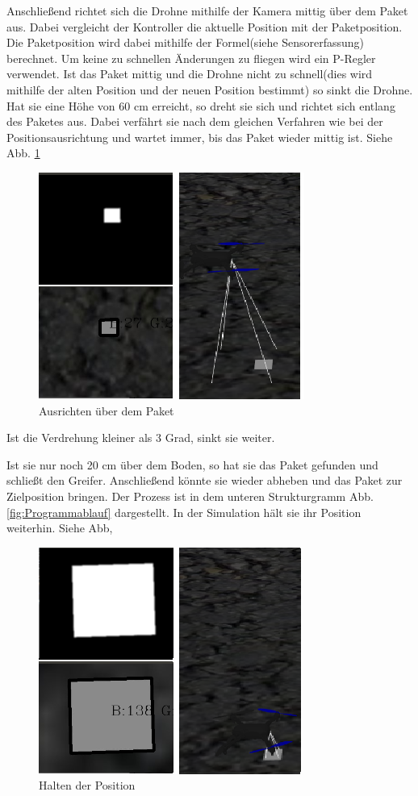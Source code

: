  Anschließend richtet sich die Drohne mithilfe der Kamera mittig über dem Paket aus. Dabei vergleicht der Kontroller die aktuelle Position mit der Paketposition. Die Paketposition wird dabei mithilfe der Formel(siehe Sensorerfassung) berechnet. Um keine zu schnellen Änderungen zu fliegen wird ein P-Regler verwendet. Ist das Paket mittig und die Drohne nicht zu schnell(dies wird mithilfe der alten Position und der neuen Position bestimmt) so sinkt die Drohne. Hat sie eine Höhe von 60 cm erreicht, so dreht sie sich und richtet sich entlang des Paketes aus. Dabei verfährt sie nach dem gleichen Verfahren wie bei der Positionsausrichtung und wartet immer, bis das Paket wieder mittig ist. Siehe Abb. \ref{fig:Drone_Simulation2}
\begin{figure}[h]
	\centering
	\includegraphics[scale=0.8]{"Grafiken/Drone_Gazebossimulatiuon2.png"}
	\caption{Ausrichten über dem Paket}
	\label{fig:Drone_Simulation2}
\end{figure}
 Ist die Verdrehung kleiner als 3 Grad, sinkt sie weiter. 
 
   Ist sie nur noch 20 cm über dem Boden, so hat sie das Paket gefunden und schließt den Greifer. Anschließend könnte sie wieder abheben und das Paket zur Zielposition bringen. Der Prozess ist in dem unteren Strukturgramm Abb. \ref{fig:Programmablauf} dargestellt. In der Simulation hält sie ihr Position weiterhin. Siehe Abb, 

\begin{figure}[h]
	\centering
	\includegraphics[scale=0.8]{"Grafiken/Drone_Gazebossimulatiuon3.png"}
	\caption{Halten der Position}
	\label{fig:Drone_Simulation3}
\end{figure}

